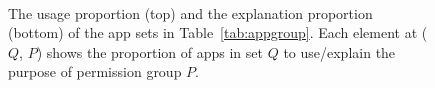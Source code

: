 \begin{figure} 
\vspace{-0.15in}
    \centering
  \\
    \vspace{-0.15in}
\caption{The usage proportion (top) and the explanation proportion (bottom) of the app sets in Table~\ref{tab:appgroup}. Each element at ($Q$, $P$) shows the proportion of apps in set $Q$ to use/explain the purpose of permission group $P$.\label{fig:mat}}
\vspace{-0.2in}
\end{figure}

